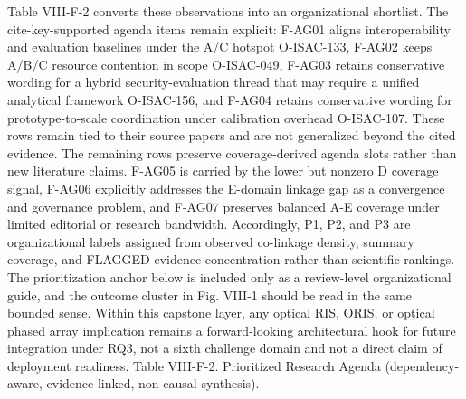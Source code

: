 {}Table VIII-F-2 converts these observations into an organizational shortlist. The cite-key-supported agenda items remain explicit: F-AG01 aligns interoperability and evaluation baselines under the A/C hotspot O-ISAC-133, F-AG02 keeps A/B/C resource contention in scope O-ISAC-049, F-AG03 retains conservative wording for a hybrid security-evaluation thread that may require a unified analytical framework O-ISAC-156, and F-AG04 retains conservative wording for prototype-to-scale coordination under calibration overhead O-ISAC-107. These rows remain tied to their source papers and are not generalized beyond the cited evidence.\markdownRendererParagraphSeparator
{}The remaining rows preserve coverage-derived agenda slots rather than new literature claims. F-AG05 is carried by the lower but nonzero D coverage signal, F-AG06 explicitly addresses the E-domain linkage gap as a convergence and governance problem, and F-AG07 preserves balanced A-E coverage under limited editorial or research bandwidth. Accordingly, P1, P2, and P3 are organizational labels assigned from observed co-linkage density, summary coverage, and FLAGGED-evidence concentration rather than scientific rankings. The prioritization anchor below is included only as a review-level organizational guide, and the outcome cluster in Fig. VIII-1 should be read in the same bounded sense.\markdownRendererParagraphSeparator
{}Within this capstone layer, any optical RIS, ORIS, or optical phased array implication remains a forward-looking architectural hook for future integration under RQ3, not a sixth challenge domain and not a direct claim of deployment readiness.\markdownRendererParagraphSeparator
{}Table VIII-F-2. Prioritized Research Agenda (dependency-aware, evidence-linked, non-causal synthesis).\markdownRendererInterblockSeparator
